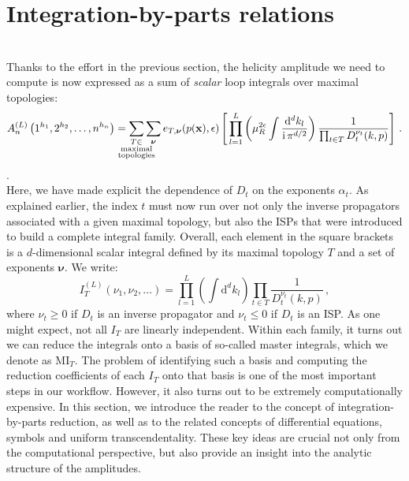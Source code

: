 \documentclass[main.tex]{subfiles}
\begin{document}
\section{Integration-by-parts relations} \label{sec:IBP}
\\
Thanks to the effort in the previous section, the helicity amplitude we need to compute is now expressed as a sum of \textit{scalar} loop integrals over maximal topologies:
\begin{equation} \label{eq:ampreducedschematic}
    	A_n^{(L)} \left(1^{h_1}, 2^{h_2}, \ldots, n^{h_n} \right) =  
     \sum_{\mathclap{\substack{T \in \\ \text{maximal} \\ \text{topologies}}}} \sum_{\bm{\nu}} e_{T, \bm{\nu}}(p(\mathbf{x}), \eps) \left[\, \prod_{l=1}^{L} 
     \left( \mu_R^{2\eps} \int \frac{\dd^d k_l}{\ii \, \pi^{d/2}}\right)
 \frac{1}{\prod_{t\in T} D^{\nu_t}_t(k,p)} \right]\,.
\end{equation}
.\\
Here, we have made explicit the dependence of $D_t$ on the exponents $\alpha_t$. As explained earlier, the index $t$ must now run over not only the inverse propagators associated with a given maximal topology, but also the ISPs that were introduced to build a complete integral family. Overall, each element in the square brackets is a $d$-dimensional scalar integral defined by its maximal topology $T$ and a set of exponents $\bm{\nu}$. We write:
\begin{equation} \label{eq:ibpintegral}
    I_T^{(L)}(\nu_1, \nu_2, \ldots) = \prod_{l=1}^{L} \left(\int \mathrm{d}^d k_l \right) \prod_{t\in T} \frac{1}{D^{\nu_t}_t(k,p)}\,,
\end{equation}
where $\nu_t \geq 0$ if $D_t$ is an inverse propagator and $\nu_t\le0$ if $D_t$ is an ISP. As one might expect, not all $I_T$ are linearly independent. Within each family, it turns out we can reduce the integrals onto a basis of so-called master integrals, which we denote as $\text{MI}_T$. The problem of identifying such a basis and computing the reduction coefficients of each $I_T$ onto that basis is one of the most important steps in our workflow. However, it also turns out to be extremely computationally expensive. In this section, we introduce the reader to the concept of integration-by-parts reduction, as well as to the related concepts of differential equations, symbols and uniform transcendentality. These key ideas are crucial not only from the computational perspective, but also provide an insight into the analytic structure of the amplitudes.
\end{document}
